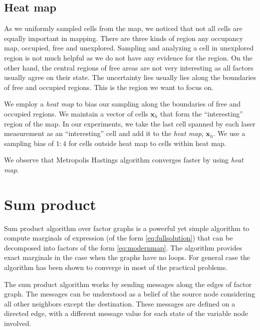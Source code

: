 \documentclass[letterpaper, 10 pt, conference]{ieeeconf} %
\newcommand{\vect}[1]{\mathbf{#1}}
\begin{document}
\subsection{Heat map}
As we uniformly sampled cells from the map, we noticed that not all
cells are equally important in mapping. There are three kinds of region any
occupancy map, occupied, free and unexplored. Sampling and analyzing a cell in
unexplored region is not much helpful as we do not have any evidence for the
region. On the other hand, the central regions of free areas are not very
interesting as all factors usually agree on their state. The uncertainty lies
usually lies along the boundaries of free and occupied regions. This is the
region we want to focus on.

We employ a \emph{heat map} to bias our sampling along the boundaries of free and occupied regions. We maintain a vector of cells $\vect{x}_h$ that form the ``interesting'' region of the map. In our experiments, we take the last cell spanned by each laser measurement as an ``interesting'' cell and add it to the \emph{heat map}, $\vect{x}_h$. We use a sampling bias of $1:4$ for cells outside heat map to cells within heat map.

We observe that Metropolis Hastings algorithm converges faster by using \emph{heat map}.

\section{Sum product}
\newcommand{\msg}[4]{\mu^{#4}_{#1\rightarrow#2}(#3)}
Sum product algorithm over factor graphs \cite{kschischang2001factor} is a
powerful yet simple algorithm to compute marginals  of
expression (of the form \eqref{eq:fullsolution}) that can be decomposed into
factors of the form \eqref{eq:modernmap}. The algorithm provides exact
marginals in the case when the graphs have no loops. For general case the
algorithm has been shown %
to converge in most of the practical problems.
 
The sum product algorithm works by sending messages along the edges of factor
graph. The messages can be understood as a belief of the source node
considering all other neighbors except the destination. These messages are
defined on a directed edge, with a different message value for each state of
the variable node involved. 
\end{document}

